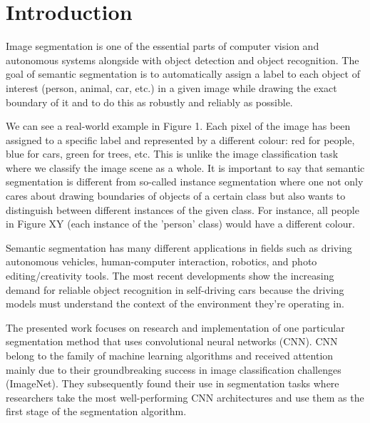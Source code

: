\chapter{Introduction}
Image segmentation is one of the essential parts of computer vision and autonomous systems alongside with object detection and object recognition. The goal of semantic segmentation is to automatically assign a label to each object of interest (person, animal, car, etc.) in a given image while drawing the exact boundary of it and to do this as robustly and reliably as possible. 

We can see a real-world example in Figure 1. Each pixel of the image has been assigned to a specific label and represented by a different colour: red for people, blue for cars, green for trees, etc. This is unlike the image classification task where we classify the image scene as a whole. It is important to say that semantic segmentation is different from so-called instance segmentation where one not only cares about drawing boundaries of objects of a certain class but also wants to distinguish between different instances of the given class. For instance, all people in Figure XY (each instance of the 'person' class) would have a different colour.

Semantic segmentation has many different applications in fields such as driving autonomous vehicles, human-computer interaction, robotics, and photo editing/creativity tools. The most recent developments show the increasing demand for reliable object recognition in self-driving cars because the driving models must understand the context of the environment they’re operating in.

The presented work focuses on research and implementation of one particular segmentation method that uses convolutional neural networks (CNN). CNN belong to the family of machine learning algorithms and received attention mainly due to their groundbreaking success in image classification challenges (ImageNet). They subsequently found their use in segmentation tasks where researchers take the most well-performing CNN architectures and use them as the first stage of the segmentation algorithm.

